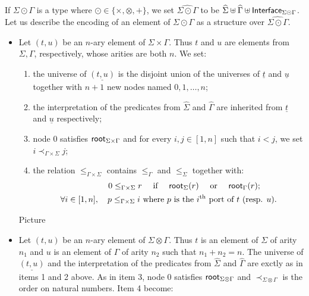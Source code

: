     If $\Sigma \odot \Gamma$ is a type where $\odot \in \{\times, \otimes,+\}$, we set $\widehat{\Sigma\odot\Gamma}$ to be $\widehat{\Sigma} \uplus \widehat{\Gamma} \uplus \mathsf{Interface}_{\Sigma\odot\Gamma}$. Let us describe the encoding of an element of $\Sigma \odot \Gamma$ as a structure over $\widehat{\Sigma\odot\Gamma}$.
     \begin{itemize}
\item Let $(t,u)$ be an $n$-ary element of $\Sigma \times \Gamma$. Thus $t$ and $u$ are elements from $\Sigma, \Gamma$, respectively, whose arities are both $n$. We set:
        \begin{enumerate}
       \item the universe of $\underline{(t,u)}$ is the disjoint union of the universes of $\underline{t}$ and $\underline{u}$ together with $n+1$ new nodes named $0,1,\dots, n$;
       \item the interpretation of the predicates from $\widehat \Sigma$ and $\widehat \Gamma$ are inherited from $\underline{t}$ and $\underline {u}$ respectively;
       \item node $0$ satisfies $\mathsf{root}_{\Sigma\times\Gamma}$ and for every $i,j \in[1,n]$ such that $i<j$, we set $i \prec_{\Gamma\times\Sigma} j$;
       \item the relation $\leq_{\Gamma\times\Sigma}$ contains   $\leq_{\Gamma}$ and $\leq_{\Sigma}$ together with:
\begin{align*}
0\leq_{\Gamma\times\Sigma} r \quad\text{ if } \quad \mathsf{root}_{\Sigma}(r) \quad\text{ or }\quad \mathsf{root}_{\Gamma}(r);\qquad\\
\forall i\in[1,n],\quad p \leq_{\Gamma\times\Sigma} i \text{ where } 
p \text{ is the } i^\text{th} \text{ port of } t \text{ (resp.  $u$)}.
\end{align*}  
        \end{enumerate}
        \begin{center}
        Picture
        \end{center}        
\item Let $(t,u)$ be an $n$-ary element of $\Sigma\otimes \Gamma$. Thus $t$ is an element of $\Sigma$ of arity $n_1$ and $u$ is an element of $\Gamma$ of arity $n_2$ such that $n_1+n_2=n$. The universe of $\underline{(t,u)}$ and the interpretation of the predicates from $\widehat \Sigma$ and $\widehat \Gamma$ are exctly as in items 1 and 2 above. As in item 3, node $0$ satisfies $\mathsf{root}_{\Sigma\otimes \Gamma}$ and $\prec_{\Sigma\otimes \Gamma}$
       is the order on natural numbers. Item 4 become:
       \begin{enumerate}

\end{enumerate}
\end{itemize}
